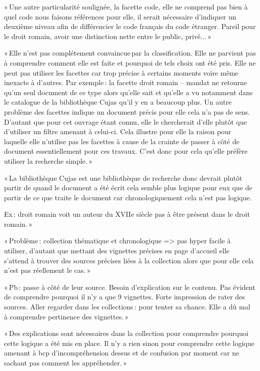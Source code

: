 « Une autre particularité soulignée, la facette code, elle ne comprend pas bien à quel code nous faisons références pour elle, il serait nécessaire d’indiquer un deuxième niveau afin de différencier le code français du code étranger. Pareil pour le droit romain, avoir une distinction nette entre le public, privé... » 

« Elle n’est pas complétement convaincue par la classification. Elle ne parvient pas à comprendre comment elle est faite et pourquoi de tels choix ont été pris. Elle ne peut pas utiliser les facettes car trop précise à certains moments voire même inexacts à d’autres. Par exemple : la facette droit romain – mandat ne retourne qu’un seul document de ce type alors qu’elle sait et qu’elle a vu notamment dans le catalogue de la bibliothèque Cujas qu’il y en a beaucoup plus. Un autre problème des facettes indique un document précis pour elle cela n’a pas de sens. D’autant que pour cet ouvrage étant connu, elle le chercherait d’elle plutôt que d’utiliser un filtre amenant à celui-ci. Cela illustre pour elle la raison pour laquelle elle n’utilise pas les facettes à cause de la crainte de passer à côté de document essentiellement pour ces travaux. C’est donc pour cela qu’elle préfère utiliser la recherche simple. »   

« La bibliothèque Cujas est une bibliothèque de recherche donc devrait plutôt partir de quand le document a été écrit cela semble plus logique pour eux que de partir de ce que traite le document car chronologiquement cela n’est pas logique.  

Ex : droit romain voit un auteur du XVIIe siècle pas à être présent dans le droit romain. » 

« Problème : collection thématique et chronologique => pas hyper facile à utiliser, d’autant que mettant des vignettes précises en page d’accueil elle s’attend à trouver des sources précises liées à la collection alors que pour elle cela n’est pas réellement le cas. » 

« Pb : passe à côté de leur source. Besoin d’explication sur le contenu. Pas évident de comprendre pourquoi il n’y a que 9 vignettes. Forte impression de rater des sources. Aller regarder dans les collections : pour tenter sa chance. Elle a dû mal à comprendre pertinence des vignettes. » 

« Des explications sont nécessaires dans la collection pour comprendre pourquoi cette logique a été mis en place. Il n’y a rien sinon pour comprendre cette logique amenant à bcp d’incompréhension dessus et de confusion par moment car ne sachant pas comment les appréhender. » 

